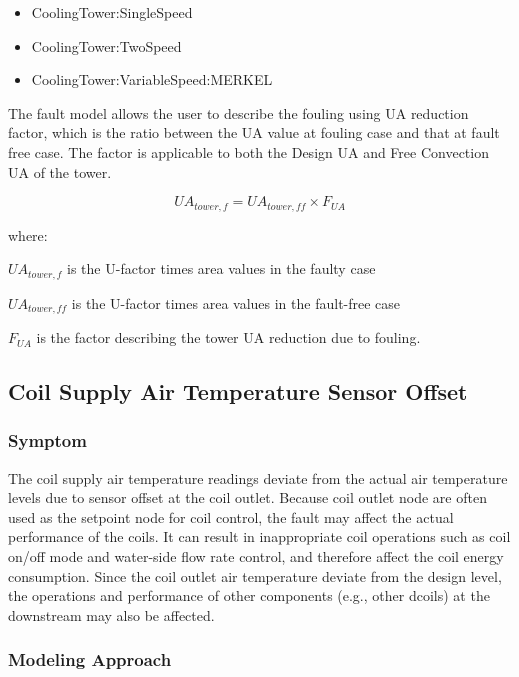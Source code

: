 \begin{itemize}
\tightlist
\item
  CoolingTower:SingleSpeed
\item
  CoolingTower:TwoSpeed
\item
  CoolingTower:VariableSpeed:MERKEL
\end{itemize}

The fault model allows the user to describe the fouling using UA reduction factor, which is the ratio between the UA value at fouling case and that at fault free case. The factor is applicable to both the Design UA and Free Convection UA of the tower. 

\begin{equation}
UA_{tower,f} = UA_{tower,ff} \times F_{UA}
\end{equation}

where:

\(UA_{tower,f}\) is the U-factor times area values in the faulty case

\(UA_{tower,ff}\) is the U-factor times area values in the fault-free case

\(F_{UA}\) is the factor describing the tower UA reduction due to fouling.


\subsection{Coil Supply Air Temperature Sensor Offset}\label{coil-supply-air-temperature-sensor-offset}

\subsubsection{Symptom}

The coil supply air temperature readings deviate from the actual air temperature levels due to sensor offset at the coil outlet. Because coil outlet node are often used as the setpoint node for coil control, the fault may affect the actual performance of the coils. It can result in inappropriate coil operations such as coil on/off mode and water-side flow rate control, and therefore affect the coil energy consumption. Since the coil outlet air temperature deviate from the design level, the operations and performance of other components (e.g., other dcoils) at the downstream may also be affected.

\subsubsection{Modeling Approach}

